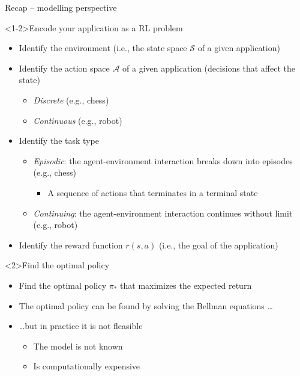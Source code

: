 \documentclass[presentation, 9pt]{beamer}\mode<presentation>{\usetheme{AMSBolognaFC}}
\begin{document}
\begin{frame}{Recap -- modelling perspective}
\begin{exampleblock}<1-2>{Encode your application as a RL problem}
\begin{itemize}
	\item Identify the environment (i.e., the state space $\mathcal{S}$ of a given application)
	\item Identify the action space $\mathcal{A}$ of a given application (decisions that affect the state)
	\begin{itemize}
		\item \emph{Discrete} (e.g., chess)
		\item \emph{Continuous} (e.g., robot)
	\end{itemize}
	\item Identify the task type 
	\begin{itemize}
		\item \emph{Episodic}: the agent-environment interaction breaks down into episodes (e.g., chess)
		\begin{itemize}
			\item A sequence of actions that terminates in a terminal state
		\end{itemize}
		\item \emph{Continuing}: the agent-environment interaction continues without limit (e.g., robot)
	\end{itemize}
	\item Identify the reward function $r(s,a)$ (i.e., the goal of the application) 
\end{itemize}
\end{exampleblock}
\begin{alertblock}<2>{Find the optimal policy}
	\begin{itemize}
		\item Find the optimal policy $\pi_*$ that maximizes the expected return
		\item The optimal policy can be found by solving the Bellman equations \dots
		\item \dots but in practice it is not fleasible
		\begin{itemize}
			\item The model is not known
			\item Is computationally expensive
		\end{itemize}
	\end{itemize}
\end{alertblock}
\end{frame}
\end{document}
